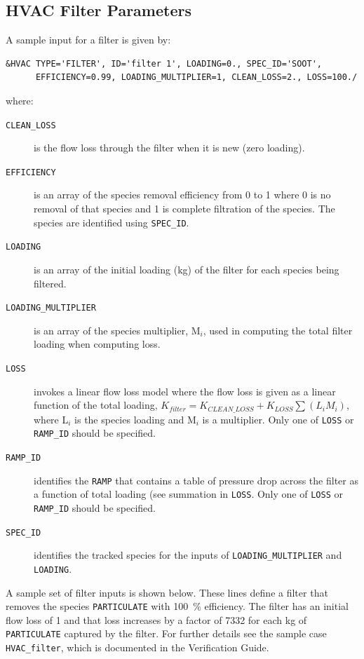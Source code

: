 \documentclass[11pt]{book}
\newcommand{\ct}{\tt\small}
\begin{document}
\subsection{HVAC Filter Parameters}
\label{info:HVACfilter}

A sample input for a filter is given by:

\footnotesize
\begin{verbatim}
&HVAC TYPE='FILTER', ID='filter 1', LOADING=0., SPEC_ID='SOOT',
      EFFICIENCY=0.99, LOADING_MULTIPLIER=1, CLEAN_LOSS=2., LOSS=100./
\end{verbatim}\normalsize

\noindent where:

\begin{description}
\item[{\ct CLEAN\_LOSS}] is the flow loss through the filter when it is new (zero loading).
\item[{\ct EFFICIENCY}] is an array of the species removal efficiency from 0 to 1 where 0 is no removal of that species and 1 is complete filtration of the species.  The species are identified using {\ct SPEC\_ID}.
\item[{\ct LOADING}] is an array of the initial loading (kg) of the filter for each species being filtered.
\item[{\ct LOADING\_MULTIPLIER}] is an array of the species multiplier, M$_i$, used in computing the total filter loading when computing loss.
\item[{\ct LOSS}] invokes a linear flow loss model where the flow loss is given as a linear function of the total loading, $K_{filter}=K_{CLEAN\_LOSS}+K_{LOSS} \sum \left( L_i M_i \right)$, where L$_i$ is the species loading and M$_i$ is a multiplier.  Only one of {\ct LOSS} or {\ct RAMP\_ID} should be specified.
\item[{\ct RAMP\_ID}] identifies the {\ct RAMP} that contains a table of pressure drop across the filter as a function of total loading (see summation in {\ct LOSS}.   Only one of {\ct LOSS} or {\ct RAMP\_ID} should be specified.
\item[{\ct SPEC\_ID}] identifies the tracked species for the inputs of {\ct LOADING\_MULTIPLIER} and {\ct LOADING}.
\end{description}

\noindent

A sample set of filter inputs is shown below.  These lines define a filter that removes the species {\ct PARTICULATE} with 100~\% efficiency.  The filter has an initial flow loss of 1 and that loss increases by a factor of 7332 for each kg of {\ct PARTICULATE} captured by the filter.  For further details see the sample case {\ct HVAC\_filter}, which is documented in the Verification Guide.
\end{document}
